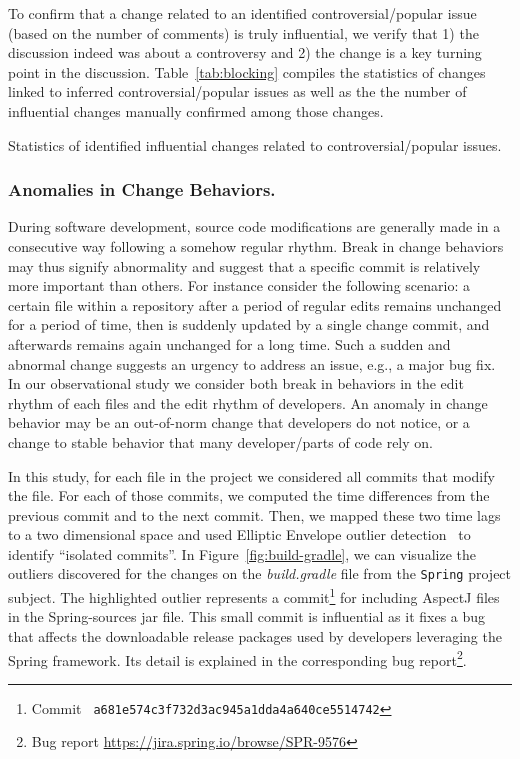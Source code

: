 To confirm that a change related to an identified controversial/popular issue (based on the number of comments) is truly influential,
we verify that 1) the discussion indeed was about a controversy and 2) the change is a key turning point in the discussion.
Table~\ref{tab:blocking}
compiles the statistics of changes linked to inferred controversial/popular issues as well as the
the number of influential changes manually confirmed among those changes.

\begin{table}[h!]
\centering
\caption{Statistics of identified influential changes related to controversial/popular issues.}

\label{tab:blocking}
\end{table}


\subsubsection{Anomalies in Change Behaviors.}
\label{sec:isolated}

During software development, source code modifications
are generally made in a consecutive way following a somehow regular rhythm.
Break in change behaviors may thus signify abnormality and suggest
that a specific commit is relatively more important than others. 
For instance consider the following scenario: a certain file within a repository
after a period of regular edits remains unchanged for a period
of time, then is suddenly updated by a single change commit, and afterwards
remains again unchanged for a long time. Such a sudden and abnormal change 
suggests an urgency to address an issue, e.g., a major bug fix.
In our observational study we consider both break in behaviors in the edit rhythm
of each files and the edit rhythm of developers.
An anomaly in change behavior may be an out-of-norm change that developers do not notice,
 or a change to stable behavior that many developer/parts of code rely on.

In this study, for each file in the project we considered all commits that
modify the file. For each of those commits, we computed the time differences
from the previous commit and to the next commit. Then, we mapped these two time
lags to a two dimensional space and used Elliptic Envelope outlier detection~\cite{rousseeuw1999fast} to
identify ``isolated commits''.
In Figure~\ref{fig:build-gradle}, we can visualize the outliers discovered for
the changes on the {\em build.gradle} file from the {\tt Spring} project
subject.
The highlighted outlier represents a commit\footnote{Commit \tt\small
a681e574c3f732d3ac945a1dda4a640ce5514742} for including AspectJ files in the
Spring-sources jar file. This small commit is influential as it
fixes a bug that affects the downloadable release packages used by developers
leveraging the Spring framework. Its detail is explained in the corresponding bug report\footnote{Bug report \url{https://jira.spring.io/browse/SPR-9576}}.


